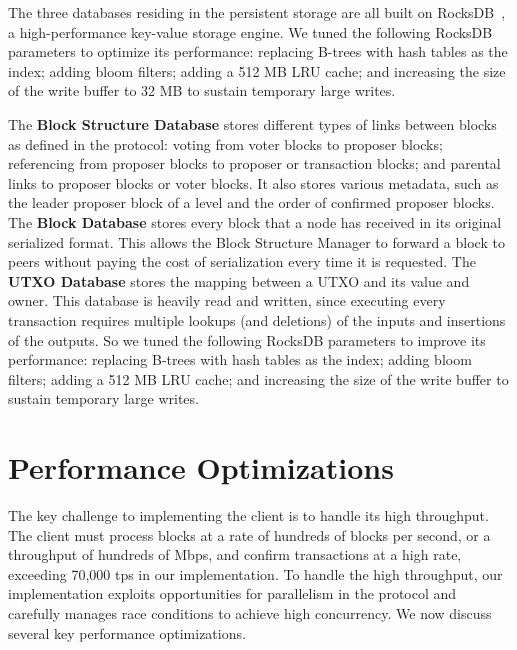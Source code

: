 The three databases residing in the persistent storage are all built on RocksDB~\cite{rocksdb}, a high-performance key-value storage engine. We tuned the following RocksDB parameters to optimize its performance: replacing B-trees with hash tables as the index; adding bloom filters; adding a 512 MB LRU cache; and increasing the size of the write buffer to 32 MB to sustain temporary large writes. 


The \textbf{Block Structure Database} stores different types of links between blocks as defined in the \prism protocol: voting from voter blocks to proposer blocks; referencing from proposer blocks to proposer or transaction blocks; and parental links to proposer blocks or voter blocks. It also stores various metadata, such as the leader proposer block of a level and the order of confirmed proposer blocks. 
The \textbf{Block Database} stores every block that a node has received in its original serialized format. This allows the Block Structure Manager to forward a block to peers without paying the cost of serialization every time it is requested. The \textbf{UTXO Database} stores the mapping between a UTXO and its value and owner. This database is heavily read and written, since executing every transaction requires multiple lookups (and deletions) of the inputs and insertions of the outputs. So we tuned the following RocksDB parameters to improve its performance: replacing B-trees with hash tables as the index; adding bloom filters; adding a 512 MB LRU cache; and increasing the size of the write buffer to sustain temporary large writes. 


\fi

\section{Performance Optimizations}

\label{sec:implementation-highlights}

The key challenge to implementing the \prism client is to handle its high throughput. The client must process blocks at a rate of hundreds of blocks per second, or a throughput of hundreds of Mbps, and confirm transactions at a high rate, exceeding 70,000 tps in our implementation. To handle the high throughput, our implementation exploits opportunities for parallelism in the protocol and carefully manages race conditions to achieve high concurrency. We now discuss several key performance optimizations. 

